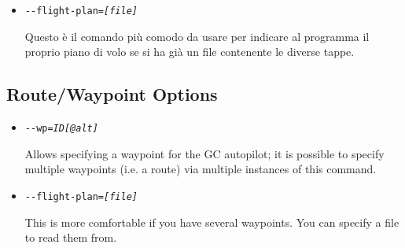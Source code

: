 \begin{itemize}
{\begin{itemize}
  \item{\texttt{-$ $-flight-plan={\it [file]}}}

    Questo \`{e} il comando pi\`{u} comodo da usare per indicare al programma il proprio piano di volo
    se si ha gi\`{a} un file contenente le diverse tappe.
  \end{itemize}
}
{
  \subsection{Route/Waypoint Options}
  \begin{itemize}
  \item{\texttt{-$ $-wp={\it ID[@alt]}}}

    Allows specifying a waypoint for the GC autopilot; it is possible to
    specify multiple waypoints (i.e. a route) via multiple instances of
    this command.

  \item{\texttt{-$ $-flight-plan={\it [file]}}}

    This is more comfortable if you have several waypoints. You can
    specify a file to read them from.
  \end{itemize}
}

\end{itemize}
